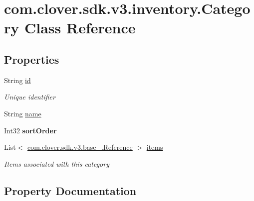 \hypertarget{classcom_1_1clover_1_1sdk_1_1v3_1_1inventory_1_1_category}{}\section{com.\+clover.\+sdk.\+v3.\+inventory.\+Category Class Reference}
\label{classcom_1_1clover_1_1sdk_1_1v3_1_1inventory_1_1_category}
\subsection*{Properties}
\begin{DoxyCompactItemize}
\item 
String \hyperlink{classcom_1_1clover_1_1sdk_1_1v3_1_1inventory_1_1_category_a72460c1defbe900b33ba38b515419b16}{id}
\begin{DoxyCompactList}\small\item\em Unique identifier \end{DoxyCompactList}\item 
String \hyperlink{classcom_1_1clover_1_1sdk_1_1v3_1_1inventory_1_1_category_aa2bb94f5244c32fa288756a1626ddd39}{name}
\item 
\mbox{\label{classcom_1_1clover_1_1sdk_1_1v3_1_1inventory_1_1_category_ad31249c22be586f1a5be0af32453885c}} 
Int32 {\bfseries sort\+Order}
\item 
List$<$ \hyperlink{classcom_1_1clover_1_1sdk_1_1v3_1_1base___1_1_reference}{com.\+clover.\+sdk.\+v3.\+base\+\_\+.\+Reference} $>$ \hyperlink{classcom_1_1clover_1_1sdk_1_1v3_1_1inventory_1_1_category_a5ed1fac5d4c5898b9fea25fc3bbddd0f}{items}
\begin{DoxyCompactList}\small\item\em Items associated with this category \end{DoxyCompactList}\end{DoxyCompactItemize}


\subsection{Property Documentation}
\mbox{\label{classcom_1_1clover_1_1sdk_1_1v3_1_1inventory_1_1_category_a72460c1defbe900b33ba38b515419b16}} 
